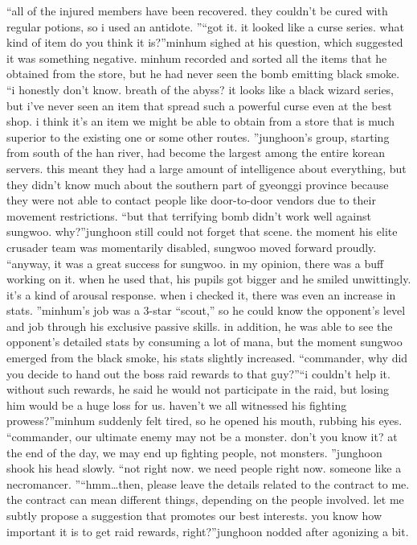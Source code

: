 “all of the injured members have been recovered.
 they couldn’t be cured with regular potions, so i used an antidote.
”“got it.
 it looked like a curse series.
 what kind of item do you think it is?”minhum sighed at his question, which suggested it was something negative.
minhum recorded and sorted all the items that he obtained from the store, but he had never seen the bomb emitting black smoke.
“i honestly don’t know.
 breath of the abyss? it looks like a black wizard series, but i’ve never seen an item that spread such a powerful curse even at the best shop.
 i think it’s an item we might be able to obtain from a store that is much superior to the existing one or some other routes.
”junghoon’s group, starting from south of the han river, had become the largest among the entire korean servers.
 this meant they had a large amount of intelligence about everything, but they didn’t know much about the southern part of gyeonggi province because they were not able to contact people like door-to-door vendors due to their movement restrictions.
“but that terrifying bomb didn’t work well against sungwoo.
 why?”junghoon still could not forget that scene.
 the moment his elite crusader team was momentarily disabled, sungwoo moved forward proudly.
“anyway, it was a great success for sungwoo.
 in my opinion, there was a buff working on it.
 when he used that, his pupils got bigger and he smiled unwittingly.
 it’s a kind of arousal response.
 when i checked it, there was even an increase in stats.
”minhum’s job was a 3-star “scout,” so he could know the opponent’s level and job through his exclusive passive skills.
in addition, he was able to see the opponent’s detailed stats by consuming a lot of mana, but the moment sungwoo emerged from the black smoke, his stats slightly increased.
“commander, why did you decide to hand out the boss raid rewards to that guy?”“i couldn’t help it.
 without such rewards, he said he would not participate in the raid, but losing him would be a huge loss for us.
 haven’t we all witnessed his fighting prowess?”minhum suddenly felt tired, so he opened his mouth, rubbing his eyes.
“commander, our ultimate enemy may not be a monster.
 don’t you know it? at the end of the day, we may end up fighting people, not monsters.
”junghoon shook his head slowly.
“not right now.
 we need people right now.
 someone like a necromancer.
”“hmm…then, please leave the details related to the contract to me.
 the contract can mean different things, depending on the people involved.
 let me subtly propose a suggestion that promotes our best interests.
 you know how important it is to get raid rewards, right?”junghoon nodded after agonizing a bit.
